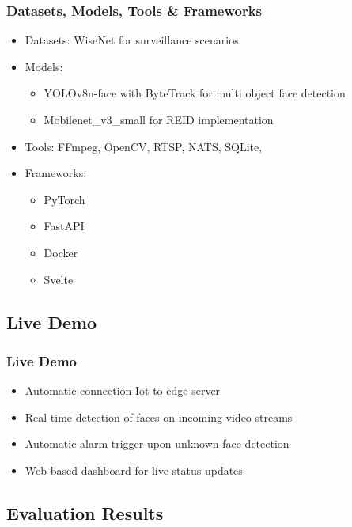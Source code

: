 \documentclass[11pt,t,usepdftitle=false,aspectratio=169]{beamer}
\begin{document}
\begin{frame}
	\frametitle{Datasets, Models, Tools \& Frameworks}
	\begin{itemize}
		\item Datasets: WiseNet for surveillance scenarios
		\item Models:
		      \begin{itemize}
			      \item YOLOv8n-face with ByteTrack for multi object face detection
			      \item Mobilenet\_v3\_small for REID implementation
		      \end{itemize}
		\item Tools: FFmpeg, OpenCV, RTSP, NATS, SQLite,
		\item Frameworks: 
		\begin{itemize}
			\item PyTorch 
			\item FastAPI
			\item Docker
			\item Svelte  
		\end{itemize}
	\end{itemize}
\end{frame}

\subsection{Live Demo}

\begin{frame}
	\frametitle{Live Demo}
	\begin{itemize}
		\item Automatic connection Iot to edge server
		\item Real-time detection of faces on incoming video streams
		\item Automatic alarm trigger upon unknown face detection
		\item Web-based dashboard for live status updates
	\end{itemize}
\end{frame}

\subsection{Evaluation Results}
\end{document}

